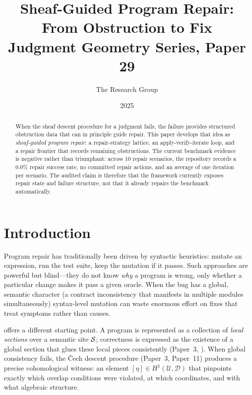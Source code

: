 \documentclass[11pt]{article}
\title{\textbf{Sheaf-Guided Program Repair:\\
       From Obstruction to Fix}\\[4pt]
       {\large Judgment Geometry Series, Paper 29}}
\author{The \JuGeo{} Research Group}
\date{2025}
\newcommand{\hone}{H^1}                     %
\begin{document}
\maketitle

\begin{abstract}
When the sheaf descent procedure for a \JuGeo{} judgment fails, the
failure provides structured obstruction data that can in principle guide
repair.  This paper develops that idea as \emph{sheaf-guided program
repair}: a repair-strategy lattice, an apply-verify-iterate loop, and a
repair frontier that records remaining obstructions.  The current
benchmark evidence is negative rather than triumphant: across 10 repair
scenarios, the repository records a 0.0\% repair success rate, no
committed repair actions, and an average of one iteration per scenario.
The audited claim is therefore that the framework currently exposes
repair state and failure structure, not that it already repairs the
benchmark automatically.
\end{abstract}

\newpage

\section{Introduction}
\label{sec:intro}

Program repair has traditionally been driven by syntactic heuristics: mutate
an expression, run the test suite, keep the mutation if it passes.  Such
approaches are powerful but blind---they do not know \emph{why} a program is
wrong, only whether a particular change makes it pass a given oracle.  When
the bug has a global, semantic character (\eg a contract inconsistency that
manifests in multiple modules simultaneously) syntax-level mutation can waste
enormous effort on fixes that treat symptoms rather than causes.

\JuGeo{} offers a different starting point.  A program is represented as a
collection of \emph{local sections} over a semantic site $\mathcal{S}$; correctness
is expressed as the existence of a global section that glues these local
pieces consistently (Paper~3, \cite{paper03}).  When global consistency
fails, the Čech descent procedure (Paper~3, Paper~11) produces a precise
cohomological witness: an element $[\eta] \in \hone(\mathcal{U},\mathcal{D})$
that pinpoints exactly which overlap conditions were violated, at which
coordinates, and with what algebraic structure.
\end{document}
